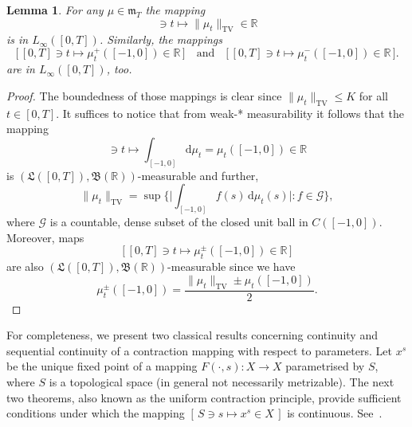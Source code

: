 \documentclass[reqno]{amsart}
\theoremstyle{plain}
\newtheorem{lemma}{Lemma}[section]
\numberwithin{equation}{section}
\numberwithin{definition}{section}
\newcommand\RR{\ensuremath{\mathbb{R}}}
\newcommand{\dd}{\ensuremath{\mathrm{d}}}
\begin{document}
\begin{lemma}\label{lemma:mu-measurable}
    For any $\mu\in\mathfrak{m}_T$ the mapping 
    \begin{equation*}
              [0,T] \ni t\mapsto \| \mu_t \|_{\mathrm{TV}}\in \RR  
    \end{equation*}
    is in $L_{\infty}([0,T])$. Similarly, the mappings 
        \begin{equation*}
         \big[\, [0,T] \ni t \mapsto  \mu_t^+([-1,0]) \in \RR \, \big  ] \quad\text{and}\quad  \big[\, [0,T] \ni t \mapsto \mu_t^-([-1,0]) \in \RR \, \big  ]. 
    \end{equation*}
    are in $L_{\infty}([0,T])$, too.
\end{lemma}
\begin{proof}
    The boundedness of those mappings is clear since $\|\mu_t\|_{\mathrm{TV}} \le K$ for all $t\in [0,T]$. It suffices to notice that from weak\nobreakdash-\hspace{0pt}* measurability it follows that the mapping  
    \begin{equation*}
           [0,T] \ni t \mapsto \int_{[-1,0]} \dd \mu_t =  \mu_t([-1,0]) \in \RR 
    \end{equation*}
    is $(\mathfrak{L}([0,T]) ,  \mathfrak{B}(\RR) )$\nobreakdash-\hspace{0pt}measurable and further, 
    \begin{equation*}
        \| \mu_t \|_{\mathrm{TV}}  = \sup\Big\{ \Big|\int_{[-1,0]} f(s) \, \dd \mu_t (s)\Big| : f\in \mathcal{G} \Big\}, 
    \end{equation*}
    where $\mathcal{G}$ is a countable, dense subset of the closed unit ball in $C([-1,0])$. 
    Moreover, maps 
    \begin{equation*}
         \big[\, [0,T] \ni t \mapsto  \mu_t^{\pm}([-1,0]) \in \RR \, \big  ] 
    \end{equation*}
are also  $(\mathfrak{L}([0,T]) ,  \mathfrak{B}(\RR) )$\nobreakdash-\hspace{0pt}measurable since we have 
\begin{equation*}
      \mu_t^{\pm}([-1,0]) =\frac{  \| \mu_t \|_{\mathrm{TV}} \pm  \mu_t([-1,0])}{2}. 
\end{equation*}
\end{proof}
For completeness, we present two classical results concerning continuity and sequential continuity of a contraction mapping with respect to parameters. Let $x^s$ be the unique fixed point of a mapping $F(\cdot,s):X\to X$ parametrised by $S$, where $S$ is a topological space (in general not necessarily metrizable). The next two theorems, also known as the uniform contraction principle, provide sufficient conditions under which the mapping $[\, S\ni s\mapsto x^s \in X \,]$ is continuous. See~\cite[Thm. B.2]{Aulbach}. 
\end{document}
